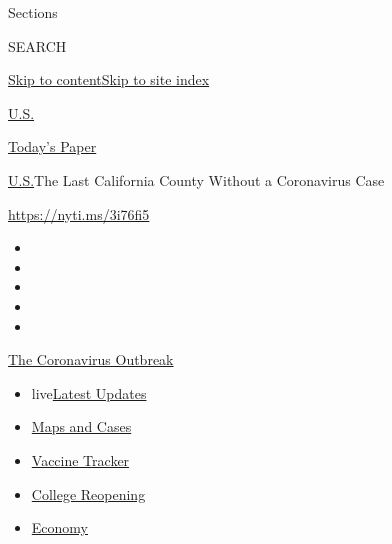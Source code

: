 Sections

SEARCH

\protect\hyperlink{site-content}{Skip to
content}\protect\hyperlink{site-index}{Skip to site index}

\href{https://www.nytimes3xbfgragh.onion/section/us}{U.S.}

\href{https://myaccount.nytimes3xbfgragh.onion/auth/login?response_type=cookie\&client_id=vi}{}

\href{https://www.nytimes3xbfgragh.onion/section/todayspaper}{Today's
Paper}

\href{/section/us}{U.S.}\textbar{}The Last California County Without a
Coronavirus Case

\url{https://nyti.ms/3i76fi5}

\begin{itemize}
\item
\item
\item
\item
\item
\end{itemize}

\href{https://www.nytimes3xbfgragh.onion/news-event/coronavirus?action=click\&pgtype=Article\&state=default\&region=TOP_BANNER\&context=storylines_menu}{The
Coronavirus Outbreak}

\begin{itemize}
\tightlist
\item
  live\href{https://www.nytimes3xbfgragh.onion/2020/08/03/world/coronavirus-covid-19.html?action=click\&pgtype=Article\&state=default\&region=TOP_BANNER\&context=storylines_menu}{Latest
  Updates}
\item
  \href{https://www.nytimes3xbfgragh.onion/interactive/2020/us/coronavirus-us-cases.html?action=click\&pgtype=Article\&state=default\&region=TOP_BANNER\&context=storylines_menu}{Maps
  and Cases}
\item
  \href{https://www.nytimes3xbfgragh.onion/interactive/2020/science/coronavirus-vaccine-tracker.html?action=click\&pgtype=Article\&state=default\&region=TOP_BANNER\&context=storylines_menu}{Vaccine
  Tracker}
\item
  \href{https://www.nytimes3xbfgragh.onion/2020/08/02/us/covid-college-reopening.html?action=click\&pgtype=Article\&state=default\&region=TOP_BANNER\&context=storylines_menu}{College
  Reopening}
\item
  \href{https://www.nytimes3xbfgragh.onion/live/2020/08/03/business/stock-market-today-coronavirus?action=click\&pgtype=Article\&state=default\&region=TOP_BANNER\&context=storylines_menu}{Economy}
\end{itemize}

